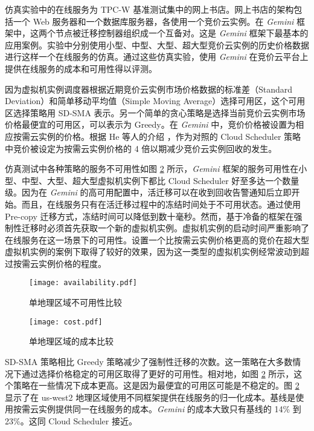 仿真实验中的在线服务为 TPC-W 基准测试集中的网上书店。网上书店的架构包括一个 Web 服务器和一个数据库服务器，各使用一个竞价云实例。在 \emph{Gemini} 框架中，这两个节点被迁移控制器组织成一个互备对。这是 \emph{Gemini} 框架下最基本的应用案例。实验中分别使用小型、中型、大型、超大型竞价云实例的历史价格数据进行这样一个在线服务的仿真。通过这些仿真实验，使用 \emph{Gemini} 在竞价云平台上提供在线服务的成本和可用性得以评测。

因为虚拟机实例调度器根据近期竞价云实例市场价格数据的标准差（Standard Deviation）和简单移动平均值（Simple Moving Average）选择可用区，这个可用区选择策略用 SD-SMA 表示。另一个简单的贪心策略是选择当前竞价云实例市场价格最便宜的可用区，可以表示为 Greedy。在 \emph{Gemini} 中，竞价价格被设置为相应按需云实例的价格。根据 He 等人的介绍 \cite{He:2015:CCH:2749246.2749275}，作为对照的 Cloud Scheduler 策略中竞价被设定为按需云实例价格的 4 倍以期减少竞价云实例回收的发生。

仿真测试中各种策略的服务不可用性如图 \ref{figure:cost} 所示，\emph{Gemini} 框架的服务可用性在小型、中型、大型、超大型虚拟机实例下都比 Cloud Scheduler 好至多达一个数量级。因为在 \emph{Gemini} 的高可用配置中，活迁移可以在收到回收告警通知后立即开始。而且，在线服务只有在活迁移过程中的冻结时间处于不可用状态。通过使用 Pre-copy 迁移方式，冻结时间可以降低到数十毫秒。然而，基于冷备的框架在强制性迁移时必须首先获取一个新的虚拟机实例。虚拟机实例的启动时间严重影响了在线服务在这一场景下的可用性。设置一个比按需云实例价格更高的竞价在超大型虚拟机实例的案例下取得了较好的效果，因为这一类型的虚拟机实例经常波动到超过按需云实例价格的程度。
\begin{figure}[]
  \centering
  \texttt{[image: availability.pdf]}
  \caption{单地理区域不可用性比较}
  \label{figure:unavailability}
\end{figure}

\begin{figure}[]
  \centering
  \texttt{[image: cost.pdf]}
  \caption{单地理区域的成本比较}
  \label{figure:cost}
\end{figure}

SD-SMA 策略相比 Greedy 策略减少了强制性迁移的次数。这一策略在大多数情况下通过选择价格稳定的可用区取得了更好的可用性。相对地，如图 \ref{figure:cost} 所示，这个策略在一些情况下成本更高。这是因为最便宜的可用区可能是不稳定的。图 \ref{figure:cost} 显示了在 us-west2 地理区域使用不同框架提供在线服务的归一化成本。基线是使用按需云实例提供同一在线服务的成本。\emph{Gemini} 的成本大致只有基线的 14\% 到 23\%。这同 Cloud Scheduler 接近。

